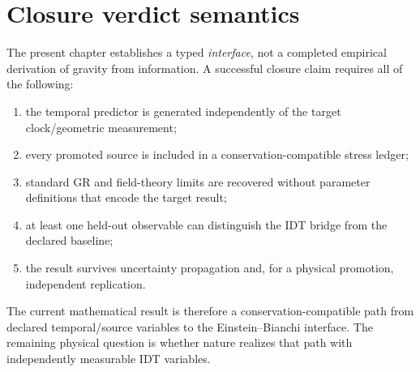 \section{Closure verdict semantics}

The present chapter establishes a typed \emph{interface}, not a completed empirical derivation of gravity from information. A successful closure claim requires all of the following:
\begin{enumerate}
\item the temporal predictor is generated independently of the target clock/geometric measurement;
\item every promoted source is included in a conservation-compatible stress ledger;
\item standard GR and field-theory limits are recovered without parameter definitions that encode the target result;
\item at least one held-out observable can distinguish the IDT bridge from the declared baseline;
\item the result survives uncertainty propagation and, for a physical promotion, independent replication.
\end{enumerate}

The current mathematical result is therefore a conservation-compatible path from declared temporal/source variables to the Einstein--Bianchi interface. The remaining physical question is whether nature realizes that path with independently measurable IDT variables.
